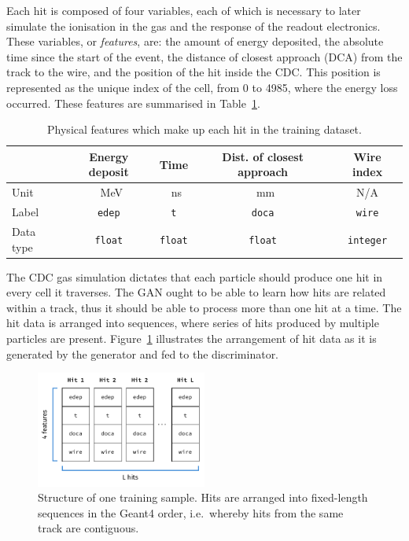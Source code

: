Each hit is composed of four variables, each of which is necessary to later
simulate the ionisation in the gas and the response of the readout electronics.
These variables, or \emph{features}, are: the amount of energy deposited, the
absolute time since the start of the event, the distance of closest approach
(DCA) from the track to the wire, and the position of the hit inside the CDC.
This position is represented as the unique index of the cell, from 0 to 4985, where the energy loss occurred. These features are summarised in
Table~\ref{tab:gan_features}.

\begin{table}
    \setlength{\tabcolsep}{12pt}
    \centering
    \begin{tabular}{l|cccc}
        \toprule
                  & \bfseries Energy deposit & \bfseries Time & \bfseries
                  Dist. of closest approach & \bfseries Wire index \\
        \midrule
        Unit      & \SI{}{\MeV}              & \SI{}{\ns}     & \SI{}{\mm}
        & N/A                  \\
        Label     & \texttt{edep}            & \texttt{t}     & \texttt{doca}
        & \texttt{wire}        \\
        Data type & \texttt{float}           & \texttt{float} & \texttt{float}
        & \texttt{integer} \\\bottomrule
    \end{tabular}
    \caption{Physical features which make up each hit in the training dataset.}
    \label{tab:gan_features}
\end{table}

The CDC gas simulation dictates that each particle should produce one hit in
every cell it traverses. The GAN ought to be able to learn how hits are related
within a track, thus it should be able to process more than one hit at a time.
The hit data is arranged into sequences, where series of hits produced by
multiple particles are present. Figure~\ref{fig:hit_data_structure} illustrates
the arrangement of hit data as it is generated by the generator and fed to the
discriminator.

\begin{figure}
    \centering
    \includegraphics[width=0.5\textwidth]{chapter4/hit_sequence.drawio.pdf}
    \caption{Structure of one training sample. Hits are arranged into
    fixed-length sequences in the {\sc Geant4} order, i.e.\ whereby hits from
    the same track are contiguous.}
    \label{fig:hit_data_structure}
\end{figure}


